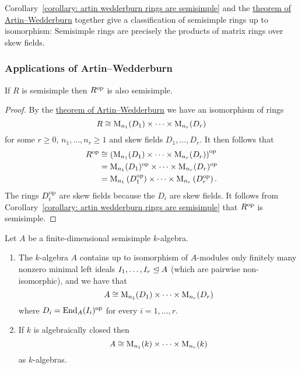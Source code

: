 \begin{remark}
  Corollary~\ref{corollary: artin wedderburn rings are semisimple} and the \hyperref[theorem: artin wedderburn theorem]{theorem of Artin--Wedderburn} together give a classification of semisimple rings up to isomorphism:
  Semisimple rings are precisely the products of matrix rings over skew fields.
\end{remark}







\subsubsection{Applications of Artin--Wedderburn}


\begin{corollary}
  If $R$ is semisimple then $R^{\mathrm{op}}$ is also semisimple.
\end{corollary}


\begin{proof}
  By the \hyperref[theorem: artin wedderburn theorem]{theorem of Artin--Wedderburn} we have an isomorphism of rings
  \[
          R
    \cong \operatorname{M}_{n_1}(D_1) \times \dotsm \times \operatorname{M}_{n_r}(D_r)
  \]
  for some $r \geq 0$, $n_1, \dotsc, n_r \geq 1$ and skew fields $D_1, \dotsc, D_r$.
  It then follows that
  \begin{align*}
            R^{\mathrm{op}}
    &\cong  \left( \operatorname{M}_{n_1}(D_1) \times \dotsm \times \operatorname{M}_{n_r}(D_r) \right)^{\mathrm{op}} \\
    &=      \operatorname{M}_{n_1}(D_1)^{\mathrm{op}} \times \dotsm \times \operatorname{M}_{n_r}(D_r)^{\mathrm{op}} \\
    &=      \operatorname{M}_{n_1}\left( D_1^{\mathrm{op}} \right) \times \dotsm \times \operatorname{M}_{n_r}\left( D_r^{\mathrm{op}} \right).
  \end{align*}
  The rings $D_i^{\mathrm{op}}$ are skew fields because the $D_i$ are skew fields.
  It follows from Corollary~\ref{corollary: artin wedderburn rings are semisimple} that $R^{\mathrm{op}}$ is semisimple.
\end{proof}


\begin{corollary}
  \label{corollary: semisimple algebra product of matrix algebras}
  Let $A$ be a finite-dimensional semisimple $k$-algebra.
  \begin{enumerate}
    \item
      The $k$-algebra $A$ contains up to isomorphism of $A$-modules only finitely many nonzero minimal left ideals $I_1, \dotsc, I_r \trianglelefteq A$ (which are pairwise non-isomorphic), and we have that
      \[
              A
        \cong \operatorname{M}_{n_1}(D_1) \times \dotsm \times \operatorname{M}_{n_r}(D_r)
      \]
      where $D_i = \operatorname{End}_A(I_i)^{\mathrm{op}}$ for every $i = 1, \dotsc, r$.
    \item
      If $k$ is algebraically closed then
      \[
              A
        \cong \operatorname{M}_{n_1}(k) \times \dotsm \times \operatorname{M}_{n_r}(k)
      \]
      as $k$-algebras.
  \end{enumerate}
\end{corollary}


